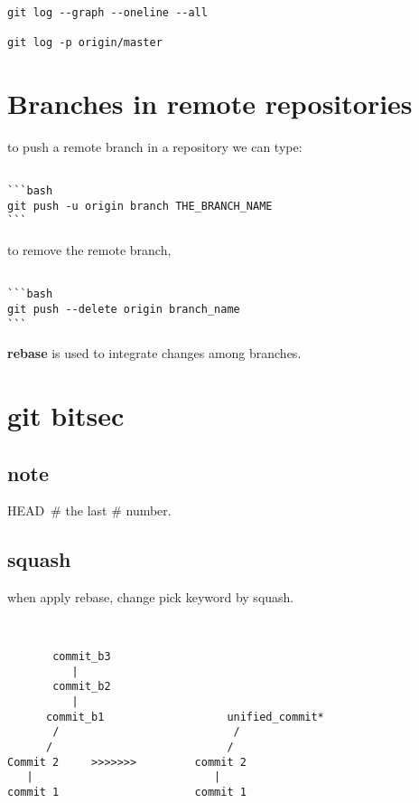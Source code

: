 \documentclass[10pt,a4paper]{article}
\begin{document}
\begin{verbatim}

git log --graph --oneline --all

git log -p origin/master

\end{verbatim}


\section{Branches in remote repositories}
to push a remote branch in a repository we can type:
\begin{verbatim}

```bash
git push -u origin branch THE_BRANCH_NAME 
``` 

\end{verbatim}

to remove the remote branch, 
\begin{verbatim}

```bash
git push --delete origin branch_name
```
\end{verbatim}
\textbf{rebase} is used to integrate changes among branches.



\section{git bitsec}


\subsection{note}
HEAD~# the last # number.


\subsection{squash}

when apply rebase, change pick keyword by
squash.

\begin{verbatim}


       commit_b3
          |                      
       commit_b2
          |
      commit_b1                   unified_commit*  
       /                           /
      /                           /
Commit 2     >>>>>>>         commit 2
   |                            |     
commit 1                     commit 1       


\end{verbatim}
\end{document}

